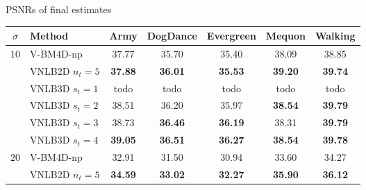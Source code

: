 \documentclass[mathserif, 8pt]{beamer}
\newcommand{\best}[1]{\textbf{\textcolor{MyOrange}{#1}}}
\newcommand{\Best}[1]{\textbf{\textcolor{MyOrangeBrighter}{#1}}}
\begin{document}
\begin{frame}{PSNRs of final estimates}


	\begin{center}
	{\tiny
	\renewcommand{\tabcolsep}{2mm}
	\renewcommand{\arraystretch}{1.0}
	\begin{tabular}{ c | l |c c c c c}
		\hline
		\rule{0pt}{6pt}$\sigma$ & Method        & Army & DogDance & Evergreen & Mequon & Walking  \\\hline
		\multirow{5}{*}{$10$} & V-BM4D-np        &       37.77  &       35.70  &       35.40  &       38.09  &       38.85  \\
		                      & VNLB2D $n_t = 5$ & \best{37.88} & \best{36.01} & \best{35.53} & \Best{39.20} & \best{39.74} \\
		                      & VNLB3D $s_t = 1$ &       todo   &       todo   &       todo   &       todo   &       todo   \\
		                      & VNLB3D $s_t = 2$ &       38.51  &       36.20  &       35.97  & \best{38.54} & \Best{39.79} \\
		                      & VNLB3D $s_t = 3$ &       38.73  & \Best{36.46} & \Best{36.19} &       38.31  & \Best{39.79} \\
		                      & VNLB3D $s_t = 4$ & \Best{39.05} & \Best{36.51} & \Best{36.27} & \best{38.54} & \Best{39.78} \\\hline
%
		\multirow{5}{*}{$20$} & V-BM4D-np        &       32.91  &       31.50  &       30.94  &       33.60  &       34.27  \\
		                      & VNLB2D $n_t = 5$ & \best{34.59} & \best{33.02} & \best{32.27} & \Best{35.90} & \best{36.12} \\

\end{tabular}}
\end{center}
\end{frame}
\end{document}
